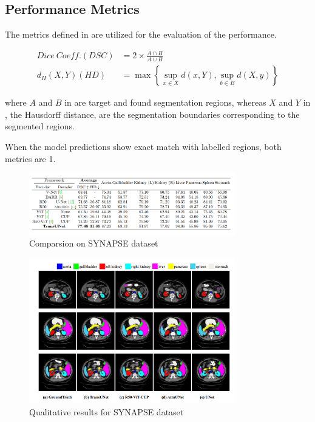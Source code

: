 \documentclass{IEEEtran}
\begin{document}
\subsection{Performance Metrics} 

The metrics defined in  are utilized for the evaluation of the performance.

\begin{align}
    Dice \ Coeff.(DSC) &= 2 \times \frac{A \cap B}{A \cup B} \label{eq:DC}\\
    d_H(X,Y) (HD) &= \max \left\{ \sup_{x\in X} d(x,Y),\sup_{b\in B} d(X,y) \right\} \label{eq:HD}
\end{align}

where $A$ and $B$ in  are target and found segmentation regions, whereas $X$ and $Y$ in , the Hausdorff distance, are the segmentation boundaries corresponding to the segmented regions.

When the model predictions show exact match with labelled regions, both metrics are 1. 

\begin{figure}[h]
\centering
\includegraphics[width=0.8\textwidth]{img/table1.png}
\caption{Comparsion on SYNAPSE dataset}\label{fig:table}
\end{figure}

\begin{figure}[h]
\centering
\includegraphics[width=0.8\textwidth]{img/results_qual.png}
\caption{Qualitative results for SYNAPSE dataset}\label{fig:synapseseg}
\end{figure}
\end{document}
